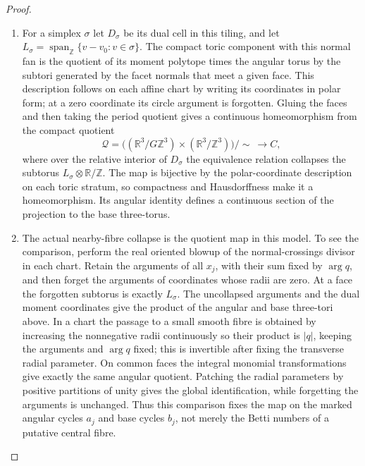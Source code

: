\documentclass[11pt,a4paper]{article}
\theoremstyle{definition}
\begin{document}
\begin{proof}
\begin{enumerate}[label=\arabic*.]
\item For a simplex $\sigma$ let $D_\sigma$ be its dual cell in this tiling,
and let
$L_\sigma=\operatorname{span}_{\mathbb Z}\{v-v_0:v\in\sigma\}$.
The compact toric component with this normal fan is the quotient of
its moment polytope times the angular torus by the subtori generated
by the facet normals that meet a given face.  This description follows
on each affine chart by writing its coordinates in polar form;
at a zero coordinate its circle argument is forgotten.  Gluing the
faces and then taking the period quotient gives a continuous
homeomorphism from the compact quotient
\[
\mathcal Q=
\bigl((\mathbb R^3/G\mathbb Z^3)\times
       (\mathbb R^3/\mathbb Z^3)\bigr)/\!\sim\ \longrightarrow C,
\]
where over the relative interior of $D_\sigma$ the equivalence
relation collapses the subtorus $L_\sigma\otimes\mathbb R/\mathbb Z$.
The map is bijective by the polar-coordinate description on each
toric stratum, so compactness and Hausdorffness make it a homeomorphism.
Its angular identity defines a continuous section of the projection to
the base three-torus.

\item The actual nearby-fibre collapse is the quotient map in this model.
To see the comparison, perform the real oriented blowup of the
normal-crossings divisor in each chart.  Retain the arguments of all
$x_j$, with their sum fixed by $\arg q$, and then forget the arguments
of coordinates whose radii are zero.  At a face the forgotten
subtorus is exactly $L_\sigma$.  The uncollapsed arguments and the
dual moment coordinates give the product of the angular and base
three-tori above.  In a chart the passage to a small smooth fibre is
obtained by increasing the nonnegative radii continuously so their
product is $|q|$, keeping the arguments and $\arg q$ fixed; this is
invertible after fixing the transverse radial parameter.  On common
faces the integral monomial transformations give exactly the same
angular quotient.  Patching the radial parameters by positive
partitions of unity gives the global identification, while forgetting
the arguments is unchanged.  Thus this comparison fixes the map on
the marked angular cycles $a_j$ and base cycles $b_j$, not merely
the Betti numbers of a putative central fibre.


\end{enumerate}
\end{proof}
\end{document}
